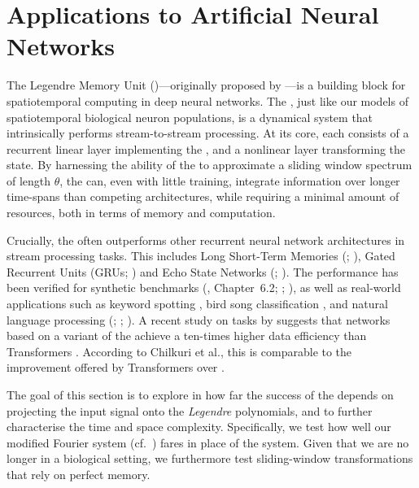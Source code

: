 
\section{Applications to Artificial Neural Networks}
\label{sec:applications_to_ml}

The Legendre Memory Unit (\LMU)---originally proposed by \citet{voelker2019lmu}---is a building block for spatiotemporal computing in deep neural networks.
The \LMU, just like our models of spatiotemporal biological neuron populations, is a dynamical system that intrinsically performs stream-to-stream processing.
At its core, each \LMU consists of a recurrent linear layer implementing the \LDN, and a nonlinear layer transforming the \LDN state.
By harnessing the ability of the \LDN to approximate a sliding window spectrum of length $\theta$, the \LMU can, even with little training, integrate information over longer time-spans than competing architectures, while requiring a minimal amount of resources, both in terms of memory and computation.

Crucially, the \LMU often outperforms other recurrent neural network architectures in stream processing tasks.
This includes Long Short-Term Memories (\LSTMpl; \cite{hochreiter1997long}), Gated Recurrent Units (GRUs; \cite{chung2014empirical}) and Echo State Networks (\ESNpl; \cite{jaeger2004harnessing}).
The \LMU performance has been verified for synthetic benchmarks (\cite{voelker2019}, Chapter~6.2; \cite{voelker2019lmu}; \cite{gu2020hippo}), as well as real-world applications such as keyword spotting \citep{blouw2021hardware}, bird song classification \citep{gupta2021comparing}, and natural language processing (\NLP; \cite{chilkuri2021parallelizinga}; \cite{chilkuri2021parallelizing}).
A recent study on \NLP tasks by \citet{chilkuri2021language} suggests that networks based on a variant of the \LMU achieve a ten-times higher data efficiency than Transformers \citep{vaswani2017attention}.
According to Chilkuri et al., this is comparable to the improvement offered by Transformers over \LSTMpl.

The goal of this section is to explore in how far the success of the \LMU depends on projecting the input signal onto the \emph{Legendre} polynomials, and to further characterise the \LMU time and space complexity.
Specifically, we test how well our modified Fourier system (cf.~) fares in place of the \LDN system.
Given that we are no longer in a biological setting, we furthermore test sliding-window transformations that rely on perfect memory.

